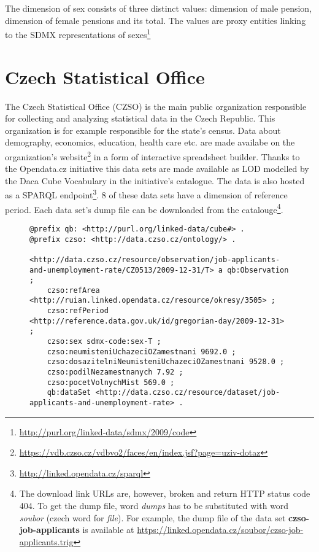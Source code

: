 The dimension of sex consists of three distinct values: dimension of male pension, dimension of female pensions and its total. The values are proxy entities linking to the SDMX representations of sexes\footnote{\href{http://purl.org/linked-data/sdmx/2009/code}{http://purl.org/linked-data/sdmx/2009/code}}

\section{Czech Statistical Office}

The Czech Statistical Office (CZSO) is the main public organization responsible for collecting and analyzing statistical data in the Czech Republic. This organization is for example responsible for the state's census. Data about demography, economics, education, health care etc. are made availabe on the organization's website\footnote{\href{https://vdb.czso.cz/vdbvo2/faces/en/index.jsf?page=uziv-dotaz}{https://vdb.czso.cz/vdbvo2/faces/en/index.jsf?page=uziv-dotaz}} in a form of interactive spreadsheet builder. Thanks to the Opendata.cz initiative this data sets are made available as LOD modelled by the Daca Cube Vocabulary in the initiative's catalogue. The data is also hosted as a SPARQL endpoint\footnote{\href{http://linked.opendata.cz/sparql}{http://linked.opendata.cz/sparql}}. 8 of these data sets have a dimension of reference period. Each data set’s dump file can be downloaded from the catalouge\footnote{The download link URLs are, however, broken and return HTTP status code 404. To get the dump file, word \textit{dumps} has to be substituted with word \textit{soubor} (czech word for \textit{file}). For example, the dump file of the data set \textbf{czso-job-applicants} is available at \href{https://linked.opendata.cz/soubor/czso-job-applicants.trig}{https://linked.opendata.cz/soubor/czso-job-applicants.trig}}.

\begin{figure}[h]
\begin{lstlisting}[language = turtle, caption={Example of an observation from the CZSO data sets}, label={turtleexample},captionpos=b escapeinside={(*@}{@*)}]
@prefix qb: <http://purl.org/linked-data/cube#> .
@prefix czso: <http://data.czso.cz/ontology/> .

<http://data.czso.cz/resource/observation/job-applicants-and-unemployment-rate/CZ0513/2009-12-31/T> a qb:Observation ;
    czso:refArea <http://ruian.linked.opendata.cz/resource/okresy/3505> ;
    czso:refPeriod <http://reference.data.gov.uk/id/gregorian-day/2009-12-31> ;
    czso:sex sdmx-code:sex-T ;
    czso:neumisteniUchazeciOZamestnani 9692.0 ;
    czso:dosazitelniNeumisteniUchazeciOZamestnani 9528.0 ;
    czso:podilNezamestnanych 7.92 ;
    czso:pocetVolnychMist 569.0 ;
    qb:dataSet <http://data.czso.cz/resource/dataset/job-applicants-and-unemployment-rate> .
\end{lstlisting}
\end{figure}


